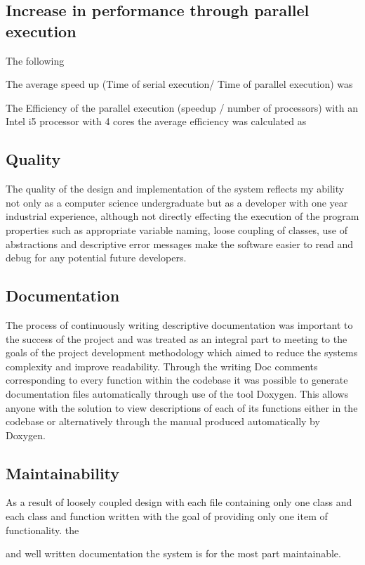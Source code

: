 \documentclass{article}
\begin{document}
\subsection{Increase in performance through parallel execution}
The following 

The average speed up (Time of serial execution/ Time of parallel execution) was 


The Efficiency of the parallel execution (speedup / number of processors) with an Intel i5 processor with 4 cores the average efficiency  was calculated as

\subsection{Quality}
The quality of the design and implementation of the system reflects my ability not only as a computer science undergraduate but as a developer with one year industrial experience, although not directly effecting the execution of the program properties such as appropriate variable naming, loose coupling of classes, use of abstractions and descriptive error messages make the software easier to read and debug for any potential future developers.


\subsection{Documentation}
The process of continuously writing descriptive documentation was important to the success of the project and was treated as an integral part to meeting to the goals of the project development methodology which aimed to reduce the systems complexity and improve readability. Through the writing Doc comments corresponding to every function within the codebase it was possible to generate documentation files automatically through use of the tool Doxygen. This allows anyone with the solution to view descriptions of each of its functions either in the codebase or alternatively through the manual produced automatically by Doxygen.

\subsection{Maintainability}
As a result of loosely coupled design with each file containing only one class and each class and function written with the goal of providing only one item of functionality. the 

and well written documentation the system is for the most part maintainable. 
\end{document}
